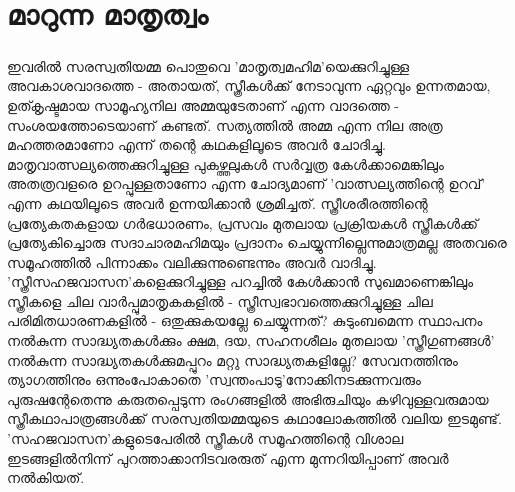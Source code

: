\chapter{മാറുന്ന മാതൃത്വം}
\label{chapter6}

\paragraph{}
\label{saraswathy} ഇവരിൽ സരസ്വതിയമ്മ പൊതുവെ 'മാതൃത്വമഹിമ'യെക്കുറിച്ചുള്ള അവകാശവാദത്തെ - അതായത്, സ്ത്രീകൾക്ക് നേടാവുന്ന ഏറ്റവും ഉന്നതമായ, ഉത്കൃഷ്ടമായ സാമൂഹ്യനില അമ്മയുടേതാണ് എന്ന വാദത്തെ - സംശയത്തോടെയാണ് കണ്ടത്. സത്യത്തിൽ അമ്മ എന്ന നില അത്ര മഹത്തരമാണോ എന്ന് തന്റെ കഥകളിലൂടെ അവർ ചോദിച്ചു. മാതൃവാത്സല്യത്തെക്കുറിച്ചുള്ള പുകഴ്ത്തലുകൾ സർവ്വത്ര കേൾക്കാമെങ്കിലും അതത്രവളരെ ഉറപ്പുള്ളതാണോ എന്ന ചോദ്യമാണ് 'വാത്സല്യത്തിന്റെ ഉറവ്' എന്ന കഥയിലൂടെ അവർ ഉന്നയിക്കാൻ ശ്രമിച്ചത്. സ്ത്രീശരീരത്തിന്റെ പ്രത്യേകതകളായ ഗർഭധാരണം, പ്രസവം മുതലായ പ്രക്രിയകൾ സ്ത്രീകൾക്ക് പ്രത്യേകിച്ചൊരു സദാചാരമഹിമയും പ്രദാനം ചെയ്യുന്നില്ലെന്നുമാത്രമല്ല അതവരെ സമൂഹത്തിൽ പിന്നാക്കം വലിക്കുന്നുണ്ടെന്നും അവർ വാദിച്ചു. 'സ്ത്രീസഹജവാസന'കളെക്കുറിച്ചുള്ള പറച്ചിൽ കേൾക്കാൻ സുഖമാണെങ്കിലും സ്ത്രീകളെ ചില വാർപ്പുമാതൃകകളിൽ - സ്ത്രീസ്വഭാവത്തെക്കുറിച്ചുള്ള ചില പരിമിതധാരണകളിൽ - ഒതുക്കുകയല്ലേ ചെയ്യുന്നത്? കുടുംബമെന്ന സ്ഥാപനം നൽകുന്ന സാദ്ധ്യതകൾക്കും ക്ഷമ, ദയ, സഹനശീലം മുതലായ 'സ്ത്രീഗുണങ്ങൾ' നൽകുന്ന സാദ്ധ്യതകൾക്കുമപ്പുറം മറ്റു സാദ്ധ്യതകളില്ലേ? സേവനത്തിനും ത്യാഗത്തിനും ഒന്നുംപോകാതെ 'സ്വന്തംപാടു'നോക്കിനടക്കുന്നവരും പുരുഷന്റേതെന്നു കരുതപ്പെടുന്ന രംഗങ്ങളിൽ അഭിരുചിയും കഴിവുള്ളവരുമായ സ്ത്രീകഥാപാത്രങ്ങൾക്ക് സരസ്വതിയമ്മയുടെ കഥാലോകത്തിൽ വലിയ ഇടമുണ്ട്. 'സഹജവാസന'കളുടെപേരിൽ സ്ത്രീകൾ സമൂഹത്തിന്റെ വിശാല ഇടങ്ങളിൽനിന്ന് പുറത്താക്കാനിടവരരുത് എന്ന മുന്നറിയിപ്പാണ് അവർ നൽകിയത്.
